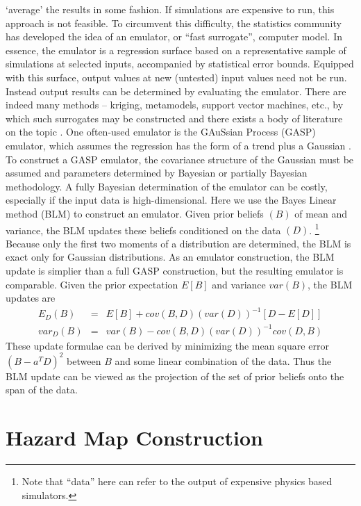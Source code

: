 \documentclass[a4paper,fleqn]{article}
\begin{document}
`average' the results in some fashion. If simulations are expensive to
run, this approach is not feasible. To circumvent this difficulty, the
statistics community has developed the idea of an emulator, or ``fast
surrogate'', computer model.  In essence, the emulator is a regression
surface based on a representative sample of simulations at selected
inputs, accompanied by statistical error bounds. Equipped with this
surface, output values at new (untested) input values need not be run.
Instead output results can be determined by evaluating the
emulator. There are indeed many methods -- kriging, metamodels,
support vector machines, etc., by which such surrogates may be
constructed and there exists a body of literature on the topic
\citep{simpson1,simpson2}.
One often-used emulator is the GAuSsian Process (GASP) emulator, which
assumes the regression has the form of a trend plus a Gaussian
\citep{kennedy2001bcc,ContiOHagan,ohagan2006bac,bayarriusc}.  To
construct a GASP emulator, the covariance structure of the Gaussian
must be assumed and parameters determined by Bayesian or partially
Bayesian methodology.  A fully Bayesian determination of the emulator
can be costly, especially if the input data is high-dimensional.  Here
we use the Bayes Linear method (BLM) \citep{blm1tutor} to construct an
emulator. Given prior beliefs $(B)$ of mean and variance, the BLM
updates these beliefs conditioned on the data $(D)$. \footnote{Note
that ``data'' here can refer to the output of expensive physics based
simulators.} Because only the first two moments of a distribution are
determined, the BLM is exact only for Gaussian distributions.  As an
emulator construction, the BLM update is simplier than a full GASP
construction, but the resulting emulator is comparable.  Given the
prior expectation $E[B]$ and variance $var(B)$, the BLM updates are
\begin{eqnarray} \label{blupdate}
E_D(B) &=& E[B] + cov(B,D) (var(D))^{-1} [D-E[D]] \\ \nonumber
var_D(B) &=& var(B) - cov(B,D) (var(D))^{-1} cov(D,B)
\end{eqnarray}
These update formulae can be derived by minimizing the mean square
error $(B - a^T D)^2$ between $B$ and some linear combination of the
data. Thus the BLM update can be viewed as the projection of the set
of prior beliefs onto the span of the data.


\section{Hazard Map Construction}
\end{document}
